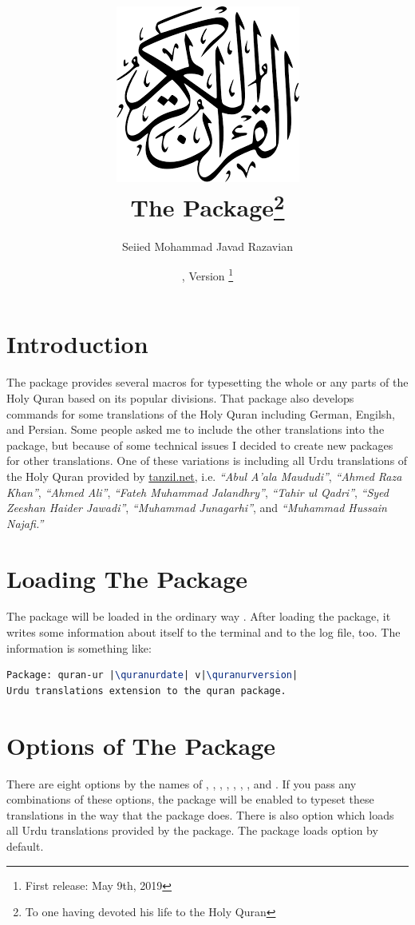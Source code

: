 \documentclass[a4paper]{ltxdoc}
\title{\includegraphics[scale=.3]{quran.png}\\
The \xpackage{quran-ur} Package\footnote{To one having devoted his life to the Holy Quran}}
\author{Seiied Mohammad Javad Razavian\\\xemail{javadr@gmail.com}}
\date{\quranurdate, Version \quranurversion\footnote{First release: May 9th, 2019}}
\begin{document}
\maketitle

\tableofcontents

\vfill
\section{Introduction}
The  package provides several macros for
typesetting the whole or any parts of the Holy Quran based on its popular divisions.
That package also develops
commands for some translations of the Holy Quran including German, Engilsh, and Persian.
Some people asked me to include the other translations into the  package,
but because of some technical issues I decided to create new packages for other translations.
One of these variations is  including all Urdu translations of the Holy Quran
provided by \url{tanzil.net}, i.e.
\emph{``Abul A'ala Maududi''}, \emph{``Ahmed Raza Khan''},
\emph{``Ahmed Ali''}, \emph{``Fateh Muhammad Jalandhry''},
\emph{``Tahir ul Qadri''}, \emph{``Syed Zeeshan Haider Jawadi''},
\emph{``Muhammad Junagarhi''}, and \emph{``Muhammad Hussain Najafi.''}


\newpage
\section{Loading The Package}
The package will be loaded in the ordinary way
.
After loading the package, it writes some information about itself to the
terminal and to the log file, too. The information is something like:

\begin{lstlisting}[style=BashInputStyle, language=tex, escapechar={|}]
Package: quran-ur |\quranurdate| v|\quranurversion|
Urdu translations extension to the quran package.
\end{lstlisting}


\section{Options of The Package}\label{sec:qurantypesetting}
There are eight options by the names of , , ,
, , , , and .
If you pass any combinations of these options, the package will be enabled to typeset these translations in the way that the  package does.
There is also  option which loads all Urdu translations provided by the  package.
The package loads  option by default.
\end{document}
